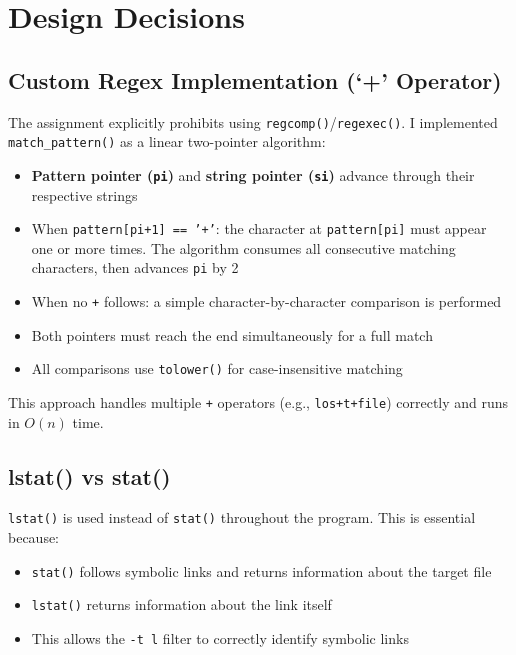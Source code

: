 \documentclass[12pt,a4paper]{article}
\begin{document}
\section{Design Decisions}

\subsection{Custom Regex Implementation (`+' Operator)}

The assignment explicitly prohibits using \texttt{regcomp()}/\texttt{regexec()}. I implemented \texttt{match\_pattern()} as a linear two-pointer algorithm:

\begin{itemize}[nosep]
    \item \textbf{Pattern pointer (\texttt{pi})} and \textbf{string pointer (\texttt{si})} advance through their respective strings
    \item When \texttt{pattern[pi+1] == '+'}: the character at \texttt{pattern[pi]} must appear one or more times. The algorithm consumes all consecutive matching characters, then advances \texttt{pi} by 2
    \item When no \texttt{+} follows: a simple character-by-character comparison is performed
    \item Both pointers must reach the end simultaneously for a full match
    \item All comparisons use \texttt{tolower()} for case-insensitive matching
\end{itemize}

This approach handles multiple \texttt{+} operators (e.g., \texttt{los+t+file}) correctly and runs in $O(n)$ time.

\subsection{lstat() vs stat()}

\texttt{lstat()} is used instead of \texttt{stat()} throughout the program. This is essential because:

\begin{itemize}[nosep]
    \item \texttt{stat()} follows symbolic links and returns information about the target file
    \item \texttt{lstat()} returns information about the link itself
    \item This allows the \texttt{-t l} filter to correctly identify symbolic links
\end{itemize}
\end{document}
